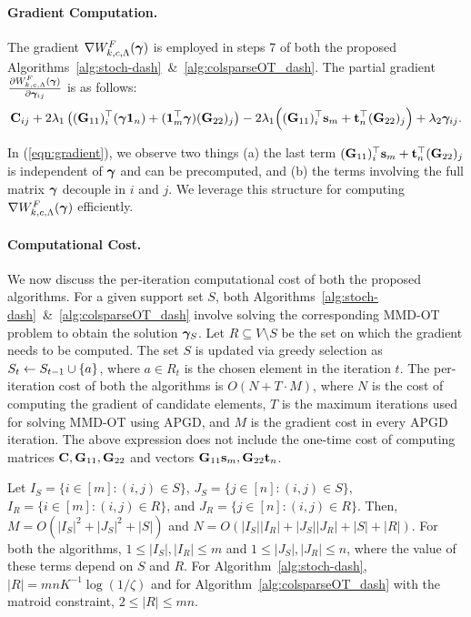 \paragraph{Gradient Computation.} The gradient $\nabla W^F_{k, c, \Lambda}(\bm{\gamma})$ is employed in steps 7 of both the proposed Algorithms~\ref{alg:stoch-dash}~\&~\ref{alg:colsparseOT_dash}. 
The partial gradient $\frac{\partial W^F_{k, c, \Lambda}(\bm{\gamma})}{\partial \bm{\gamma}_{ij}}$ is as follows:
\begin{align}\label{eqn:gradient}
 \mathbf{C}_{ij} + 2\lambda_1 \left((\mathbf{G}_{11})_i^\top (\bm{\gamma} \mathbf{1}_n) +  (\mathbf{1}_m^\top\bm{\gamma})(\mathbf{G}_{22})_j\right) - 2\lambda_1 \Big((\mathbf{G}_{11})_i^\top \mathbf{s}_m
+ \mathbf{t}_n^\top (\mathbf{G}_{22})_j\Big) + \lambda_2 \bm{\gamma}_{ij}.
\end{align}

In (\ref{eqn:gradient}), we observe two things (a) the last term $(\mathbf{G}_{11})_i^\top \mathbf{s}_m + \mathbf{t}_n^\top (\mathbf{G}_{22})_j$ is independent of $\bm{\gamma}$ and can be precomputed, and 
(b) the terms involving the full matrix $\bm{\gamma}$ decouple in $i$ and $j$. 
We leverage this structure for computing $\nabla W^F_{k, c, \Lambda}(\bm{\gamma})$ efficiently. 

\paragraph{Computational Cost.} We now discuss the per-iteration computational cost of both the proposed algorithms. For a given support set $S$, both Algorithms~\ref{alg:stoch-dash}~\&~\ref{alg:colsparseOT_dash} involve solving the corresponding MMD-OT problem to obtain the solution $\bm{\gamma}_S$. Let $R\subseteq V\setminus S$ be the set on which the gradient needs to be computed. The set $S$ is updated via greedy selection as $S_t\leftarrow S_{t-1}\cup \{a\}$, where $a\in R_t$ is the chosen element in the iteration $t$. The per-iteration cost of both the algorithms is $O(N+T\cdot M)$, where $N$ is the cost of computing the gradient of candidate elements, $T$ is the maximum iterations used for solving MMD-OT using APGD, and $M$ is the gradient cost in every APGD iteration. The above expression does not include the one-time cost of computing matrices $\mathbf{C},\mathbf{G}_{11},\mathbf{G}_{22}$ and vectors $\mathbf{G}_{11}\mathbf{s}_m,\mathbf{G}_{22}\mathbf{t}_n$. 

Let $I_S=\{i\in [m]:(i,j)\in S\}$, $J_S=\{j\in [n]:(i,j)\in S\}$, $I_R=\{i\in [m]:(i,j)\in R\}$, and $J_R=\{j\in [n]:(i,j)\in R\}$. 
Then, $M=O(|I_S|^2 + |J_S|^2 + |S|)$ and $N=O(|I_S||I_R| + |J_S||J_R| + |S| + |R|)$. For both the algorithms, $1\leq|I_S|,|I_R|\leq m$ and $1\leq|J_S|,|J_R|\leq n$, where the  value of these terms depend on $S$ and $R$. For Algorithm~\ref{alg:stoch-dash}, $|R|=mnK^{-1}\log(1/\zeta)$ and for Algorithm~\ref{alg:colsparseOT_dash} with the matroid constraint, $2\leq |R|\leq mn$.

